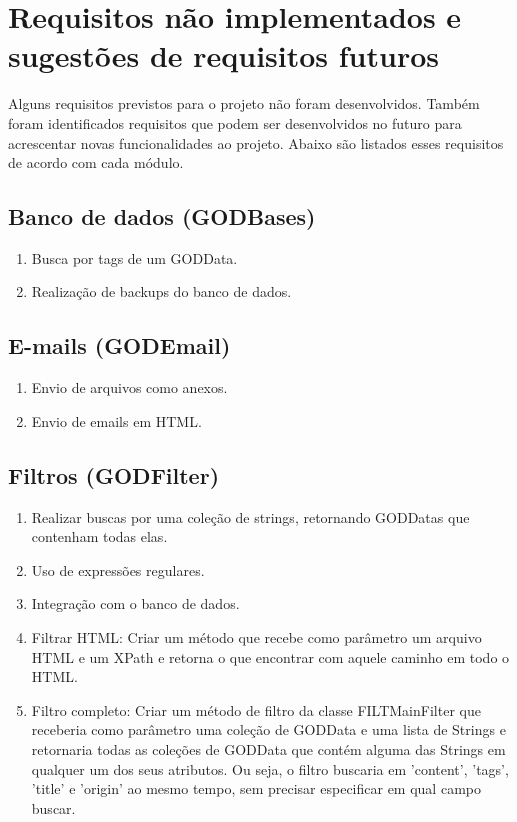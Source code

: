 \section{Requisitos não implementados e sugestões de requisitos futuros}

Alguns requisitos previstos para o projeto não foram desenvolvidos. Também foram identificados requisitos que podem ser desenvolvidos no futuro para acrescentar novas funcionalidades ao projeto. Abaixo são listados esses requisitos de acordo com cada módulo.

\subsection{Banco de dados (GODBases)}
\begin{enumerate}
\item Busca por tags de um GODData.
\item Realização de backups do banco de dados.
\end{enumerate}

\subsection{E-mails (GODEmail)}
\begin{enumerate}
\item Envio de arquivos como anexos.
\item Envio de emails em HTML.
\end{enumerate}

\subsection{Filtros (GODFilter)}
\begin{enumerate}
\item Realizar buscas por uma coleção de strings, retornando GODDatas que contenham todas elas.
\item Uso de expressões regulares.
\item Integração com o banco de dados.
\item Filtrar HTML: Criar um método que recebe como parâmetro um arquivo HTML e um XPath e retorna o que encontrar com aquele caminho em todo o HTML.
\item Filtro completo: Criar um método de filtro da classe FILTMainFilter que receberia como parâmetro uma coleção de GODData e uma lista de Strings e retornaria todas as coleções de GODData que contém alguma das Strings em qualquer um dos seus atributos. Ou seja, o filtro buscaria em 'content', 'tags', 'title' e 'origin' ao mesmo tempo, sem precisar especificar em qual campo buscar.
\end{enumerate}

